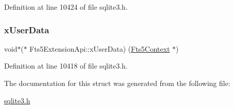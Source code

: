 Definition at line 10424 of file sqlite3.\+h.

\mbox{\label{struct_fts5_extension_api_a8e651288d8e0cf25f20f2b838f47ac34}} 
\subsubsection{\texorpdfstring{x\+User\+Data}{xUserData}}
{\footnotesize\ttfamily void$\ast$($\ast$ Fts5\+Extension\+Api\+::x\+User\+Data) (\mbox{\hyperlink{sqlite3_8h_a97821b95ebebd43db901977ffd5b26bc}{Fts5\+Context}} $\ast$)}



Definition at line 10418 of file sqlite3.\+h.



The documentation for this struct was generated from the following file\+:\begin{DoxyCompactItemize}
\item 
\mbox{\hyperlink{sqlite3_8h}{sqlite3.\+h}}\end{DoxyCompactItemize}
